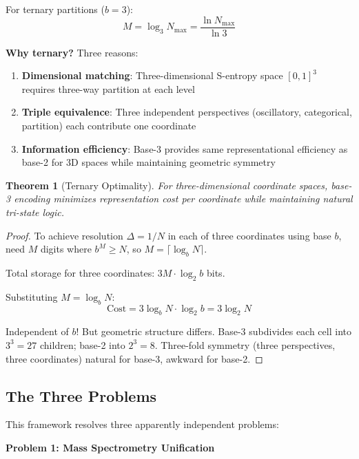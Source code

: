 \documentclass[twocolumn,10pt]{revtex4-2}
\newtheorem{theorem}{Theorem}[section]
\theoremstyle{definition}
\theoremstyle{remark}
\newcommand{\Nmax}{N_{\max}}
\begin{document}
\noindent For ternary partitions ($b=3$):
\begin{equation}
M = \log_3 \Nmax = \frac{\ln \Nmax}{\ln 3}
\end{equation}

\textbf{Why ternary?} Three reasons:

\begin{enumerate}
\item \textbf{Dimensional matching}: Three-dimensional S-entropy space $[0,1]^3$ requires three-way partition at each level
\item \textbf{Triple equivalence}: Three independent perspectives (oscillatory, categorical, partition) each contribute one coordinate
\item \textbf{Information efficiency}: Base-3 provides same representational efficiency as base-2 for 3D spaces while maintaining geometric symmetry
\end{enumerate}

\begin{theorem}[Ternary Optimality]
\label{thm:ternary}
For three-dimensional coordinate spaces, base-3 encoding minimizes representation cost per coordinate while maintaining natural tri-state logic.
\end{theorem}

\begin{proof}
To achieve resolution $\Delta = 1/N$ in each of three coordinates using base $b$, need $M$ digits where $b^M \geq N$, so $M = \lceil \log_b N \rceil$.

Total storage for three coordinates: $3M \cdot \log_2 b$ bits.

Substituting $M = \log_b N$:
\begin{equation}
\text{Cost} = 3 \log_b N \cdot \log_2 b = 3 \log_2 N
\end{equation}

Independent of $b$! But geometric structure differs. Base-3 subdivides each cell into $3^3 = 27$ children; base-2 into $2^3 = 8$. Three-fold symmetry (three perspectives, three coordinates) natural for base-3, awkward for base-2.
\end{proof}

\subsection{The Three Problems}

This framework resolves three apparently independent problems:

\textbf{Problem 1: Mass Spectrometry Unification}
\end{document}
